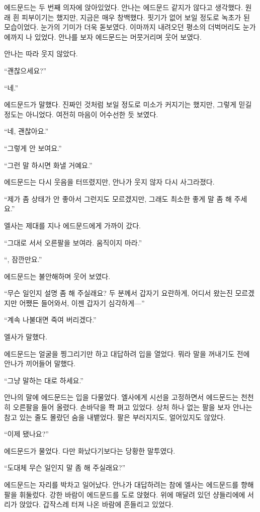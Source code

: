 에드문드는 두 번째 의자에 앉아있었다. 안나는 에드문드 같지가 않다고 생각했다. 원래 흰 피부이기는 했지만, 지금은 매우 창백했다. 핏기가 없어 보일 정도로 녹초가 된 모습이었다. 눈가의 기미가 더욱 돋보였다. 이마까지 내려오던 평소의 더벅머리도 눈가에까지 나 있었다. 안나를 보자 에드문드는 머뭇거리며 웃어 보였다.

안나는 따라 웃지 않았다.

``괜찮으세요?''

``네.''

에드문드가 말했다. 진짜인 것처럼 보일 정도로 미소가 커지기는 했지만, 그렇게 믿길 정도는 아니었다. 여전히 마음이 어수선한 듯 보였다.

``네, 괜찮아요.''

``그렇게 안 보여요.''

``그런 말 하시면 화낼 거예요.''

에드문드는 다시 웃음을 터뜨렸지만, 안나가 웃지 않자 다시 사그라졌다.

``제가 좀 상태가 안 좋아서 그런지도 모르겠지만, 그래도 최소한 좋게 말 좀 해 주세요.''

엘사는 제대를 지나 에드문드에게 가까이 갔다.

``그대로 서서 오른팔을 보여라. 움직이지 마라.''

``, 잠깐만요.''

에드문드는 불안해하며 웃어 보였다.

``무슨 일인지 설명 좀 해 주실래요? 두 분께서 갑자기 요란하게, 어디서 왔는진 모르겠지만 어쨌든 들어와서, 이젠 갑자기 심각하게—''

``계속 나불대면 죽여 버리겠다.''

엘사가 말했다.

에드문드는 얼굴을 찡그리기만 하고 대답하려 입을 열었다. 뭐라 말을 꺼내기도 전에 안나가 끼어들어 말했다.

``그냥 말하는 대로 하세요.''

안나의 말에 에드문드는 입을 다물었다. 엘사에게 시선을 고정하면서 에드문드는 천천히 오른팔을 들어 올렸다. 손바닥을 쫙 펴고 있었다. 상처 하나 없는 팔을 보자 안나는 참고 있는 줄도 몰랐던 숨을 내뱉었다. 팔은 부러지지도, 얼어있지도 않았다.

``이제 됐나요?''

에드문드가 물었다. 다만 화났다기보다는 당황한 말투였다.

``도대체 무슨 일인지 말 좀 해 주실래요?''

에드문드는 자리를 박차고 일어났다. 안나가 대답하려는 참에 엘사는 에드문드를 향해 팔을 휘둘렀다. 강한 바람이 에드문드를 도로 앉혔다. 위에 매달려 있던 샹들리에에 서리가 앉았다. 갑작스레 터져 나온 바람에 흔들리고 있었다.

